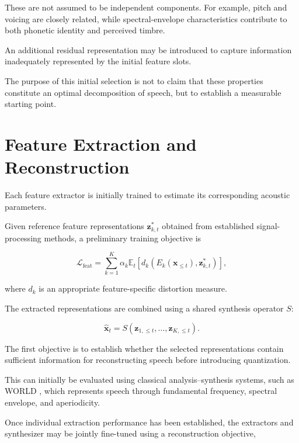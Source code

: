 \documentclass{article}
\begin{document}
These are not assumed to be independent components.
For example, pitch and voicing are closely related,
while spectral-envelope characteristics contribute to
both phonetic identity and perceived timbre.

An additional residual representation may be introduced
to capture information inadequately represented by the
initial feature slots.

The purpose of this initial selection is not to claim
that these properties constitute an optimal decomposition
of speech, but to establish a measurable starting point.

\section{Feature Extraction and Reconstruction}

Each feature extractor is initially trained to estimate
its corresponding acoustic parameters.

Given reference feature representations
$\mathbf{z}_{k,t}^{*}$ obtained from established
signal-processing methods, a preliminary training
objective is

\begin{equation}
    \mathcal{L}_{\mathrm{feat}}
    =
    \sum_{k=1}^{K}
    \alpha_k
    \mathbb{E}_t
    \left[
    d_k\left(
    E_k(\mathbf{x}_{\leq t}),
    \mathbf{z}_{k,t}^{*}
    \right)
    \right],
\end{equation}

where $d_k$ is an appropriate feature-specific
distortion measure.

The extracted representations are combined using a
shared synthesis operator $S$:

\begin{equation}
    \boxed{
    \hat{\mathbf{x}}_t
    =
    S(\mathbf{z}_{1,\leq t},
      \ldots,
      \mathbf{z}_{K,\leq t}).
    }
\end{equation}

The first objective is to establish whether the
selected representations contain sufficient information
for reconstructing speech before introducing quantization.

This can initially be evaluated using classical
analysis--synthesis systems, such as WORLD
\cite{world}, which represents speech through
fundamental frequency, spectral envelope,
and aperiodicity.

Once individual extraction performance has been
established, the extractors and synthesizer may be
jointly fine-tuned using a reconstruction objective,
\end{document}
